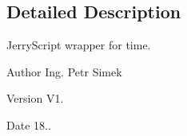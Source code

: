 \subsection{Detailed Description}
Jerry\+Script wrapper for time. 

\begin{DoxyAuthor}{Author}
Ing. Petr Simek 
\end{DoxyAuthor}
\begin{DoxyVersion}{Version}
V1. 
\end{DoxyVersion}
\begin{DoxyDate}{Date}
18.. 
\end{DoxyDate}
